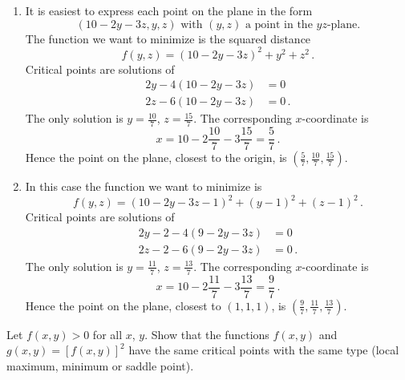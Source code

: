\begin{solution}
\begin{enumerate}
\item
It is easiest to express each point on the plane in the form
\[
(10-2y-3z, y, z) \text{ with } (y,z) \text{ a point in the $yz$-plane.}
\]
The function we want to minimize is the squared distance
\[
f(y,z) = (10-2y-3z)^2 + y^2 + z^2\,.
\]
Critical points are solutions of
\begin{align*}
2y - 4(10-2y-3z) &= 0 \\
2z - 6 (10-2y-3z) &= 0\,.
\end{align*}
The only solution is $\displaystyle y=\frac{10}7$, $\displaystyle z=\frac{15}7$. The corresponding $x$-coordinate is
\[
x = 10-2\frac {10}7 -3\frac{15}7 = \frac 5 7\,.
\]
Hence the point on the plane, closest to the origin, is $\displaystyle \left(\frac 57, \frac{10}7, \frac{15}7 \right)$.

\item
In this case the function we want to minimize is
\[
f(y,z) = (10-2y-3z-1)^2 + (y-1)^2 + (z-1)^2\,.
\]
Critical points are solutions of
\begin{align*}
2y-2 - 4(9-2y-3z) &= 0 \\
2z-2 - 6 (9-2y-3z) &= 0\,.
\end{align*}
The only solution is $\displaystyle y=\frac{11}7$, $\displaystyle z=\frac{13}7$. The corresponding $x$-coordinate is
\[
x = 10-2\frac {11}7 -3\frac{13}7 = \frac 9 7\,.
\]
Hence the point on the plane, closest to $(1,1,1)$, is $\displaystyle \left(\frac 97, \frac{11}7, \frac{13}7 \right)$.
\end{enumerate}
\end{solution}

\begin{question}
Let $f(x,y) > 0$ for all $x$, $y$. Show that the functions $f(x,y)$ and $g(x,y) = [f(x,y)]^2$ have the same critical points with the same type (local maximum, minimum or saddle point).
\end{question}

